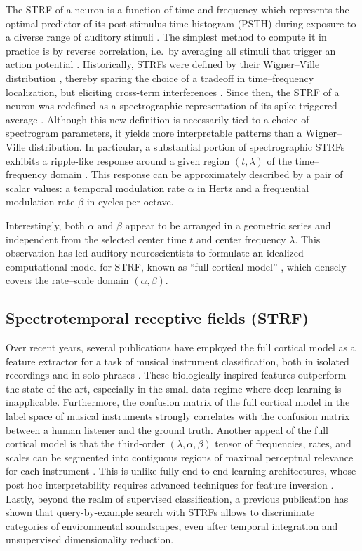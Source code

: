 \documentclass{bmcart}
\begin{document}
The STRF of a neuron is a function of time and frequency which represents the optimal predictor of its post-stimulus time histogram (PSTH) during exposure to a diverse range of auditory stimuli \cite{aertsen1981biolcyb}.
The simplest method to compute it in practice is by reverse correlation, i.e.\ by averaging all stimuli that trigger an action potential \cite{deboer1968biomed}.
Historically, STRFs were defined by their Wigner--Ville distribution \cite{flandrin1998book}, thereby sparing the choice of a tradeoff in time--frequency localization, but eliciting cross-term interferences \cite{eggermont1993hearing}.
Since then, the STRF of a neuron was redefined as a spectrographic representation of its spike-triggered average \cite{klein2000compneur}.
Although this new definition is necessarily tied to a choice of spectrogram parameters, it yields more interpretable patterns than a Wigner--Ville distribution.
In particular, a substantial portion of spectrographic STRFs exhibits a ripple-like response around a given region $(t, \lambda)$ of the time--frequency domain \cite{theunissen2000jneur}.
This response can be approximately described by a pair of scalar values: a temporal modulation rate $\alpha$ in Hertz and a frequential modulation rate $\beta$ in cycles per octave.

Interestingly, both $\alpha$ and $\beta$ appear to be arranged in a geometric series and independent from the selected center time $t$ and center frequency $\lambda$.
This observation has led auditory neuroscientists to formulate an idealized computational model for STRF, known as ``full cortical model'' \cite{chi2005jasa}, which densely covers the rate--scale domain $(\alpha, \beta)$.


\subsection*{Spectrotemporal receptive fields (STRF)}
Over recent years, several publications have employed the full cortical model as a feature extractor for a task of musical instrument classification, both in isolated recordings \cite{patil2012ploscompbiol} and in solo phrases \cite{patil2015eurasip}.
These biologically inspired features outperform the state of the art, especially in the small data regime where deep learning is inapplicable.
Furthermore, the confusion matrix of the full cortical model in the label space of musical instruments strongly correlates with the confusion matrix between a human listener and the ground truth.
Another appeal of the full cortical model is that the third-order $(\lambda, \alpha, \beta)$ tensor of frequencies, rates, and scales can be segmented into contiguous regions of maximal perceptual relevance for each instrument \cite{thoret2016jasa}.
This is unlike fully end-to-end learning architectures, whose post hoc interpretability requires advanced techniques for feature inversion \cite{mishra2018ismir}.
Lastly, beyond the realm of supervised classification, a previous publication \cite{hemery2015frontiers} has shown that query-by-example search with STRFs allows to discriminate categories of environmental soundscapes, even after temporal integration and unsupervised dimensionality reduction.
\end{document}
